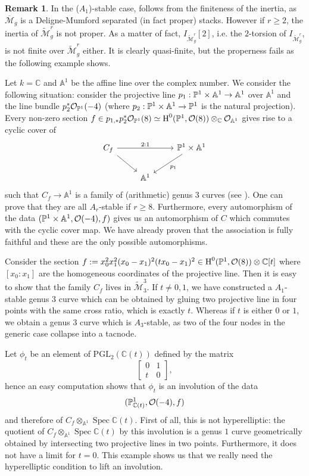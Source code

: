 \documentclass{alggeom}
\numberwithin{equation}{section}
\numberwithin{subsection}{section}
\theoremstyle{definition}
\newtheorem{remark}[theorem]{Remark}
\theoremstyle{remark}
\newcommand\cO{\mathcal{O}} \newcommand\cP{\mathcal{P}}
\renewcommand\AA{\mathbb{A}} \newcommand\BB{\mathbb{B}}
\newcommand\CC{\mathbb{C}} \newcommand\DD{\mathbb{D}}
\renewcommand\H{\operatorname{H}}
\newcommand\spec{\operatorname{Spec}}
\newcommand{\PGL}{\mathrm{PGL}}
\newcommand{\Mtilde}{\widetilde{\mathcal M}}
\begin{document}
\begin{remark}
	In the ($A_1$)-stable case,  follows from the finiteness of the inertia, as $\overline{\mathcal{M}}_g$ is a Deligne-Mumford separated (in fact proper) stacks. However if $r\geq 2$, the inertia of $\Mtilde_g^r$ is not proper. As a matter of fact, $I_{\Mtilde_g^r}[2]$, i.e. the $2$-torsion of $I_{\Mtilde_g^r}$, is not finite over $\Mtilde_g^r$ either. It is clearly quasi-finite, but the properness fails as the following example shows. 
	
	Let $k=\CC$ and $\AA^1$ be the affine line over the complex number. We consider the following situation: consider the projective line $p_1:\PP^1\times \AA^1\rightarrow \AA^1$ over $\AA^1$ and the line bundle $p_2^*\cO_{\PP^1}(-4)$ (where $p_2:\PP^1\times \AA^1\rightarrow \PP^1$ is the natural projection). Every non-zero section $f\in p_{1,*}p_2^*\cO_{\PP^1}(8)\simeq \H^0(\PP^1,\cO(8)) \otimes_{\CC} \cO_{\AA^1}$ gives rise to a cyclic cover of 
	$$\begin{tikzcd}
	C_f\arrow[rd] \arrow[rr, "2:1"] &       & \PP^1\times\AA^1 \arrow[ld, "p_1"] \\
	& \AA^1 &                                   
	\end{tikzcd}$$
	 such that $C_f\rightarrow \AA^1$ is a family of (arithmetic) genus $3$ curves (see \cite{ArVis}). One can prove that they are all $A_r$-stable if $r\geq 8$. Furthermore, every automorphism of the data $(\PP^1\times \AA^1,\cO(-4),f)$ gives us an automorphism of $C$ which commutes with the cyclic cover map. We have already proven that the association is fully faithful and these are the only possible automorphisms. 
	 
	 Consider the section $f:=x_0^2x_1^2(x_0-x_1)^2(tx_0-x_1)^2 \in \H^0(\PP^1,\cO(8))\otimes \CC[t]$ where $[x_0:x_1]$ are the homogeneous coordinates of the projective line. Then it is easy to show that the family $C_f$ lives in $\Mtilde_3^3$. If $t\neq 0,1$, we have constructed a $A_1$-stable genus $3$ curve which can be obtained by gluing two projective line in four points with the same cross ratio, which is exactly $t$. Whereas if $t$ is either $0$ or $1$, we obtain a genus $3$ curve which is $A_3$-stable, as two of the four nodes in the generic case collapse into a tacnode. 
	 
	 Let $\phi_t$ be an element of $\PGL_2(\CC(t))$ defined by the matrix
	 $$
	 \begin{bmatrix}
	 0  &  1 \\
	 t  &  0
	 \end{bmatrix},
	 $$
	 hence an easy computation shows that $\phi_t$ is an involution of the data $$(\PP^1_{\CC(t)},\cO(-4),f)$$ and therefore of $C_f\otimes_{\AA^1}\spec \CC(t)$. First of all, this is not hyperelliptic: the quotient of $C_f\otimes_{\AA^1}\spec \CC(t)$ by this involution is a genus $1$ curve geometrically obtained by intersecting two projective lines in two points. Furthermore, it does not have a limit for $t=0$. This example shows us that we really need the hyperelliptic condition to lift an involution.
\end{remark}
\end{document}
